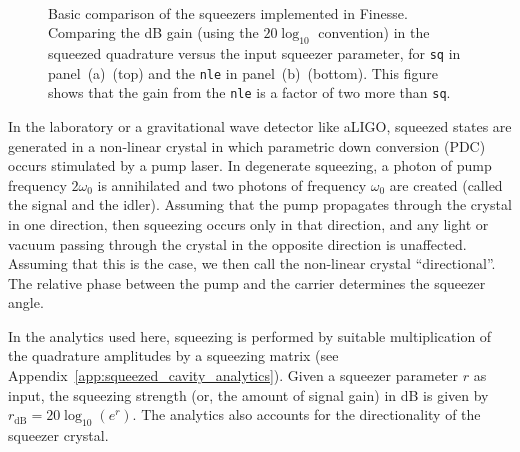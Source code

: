 \documentclass[aps,pra,superscriptaddress,reprint,nofootinbib]{revtex4-1}
\newcommand{\code}[1]{\texttt{#1}}
\begin{document}
\begin{figure}[ht]%
    \centering
    \\
    \caption{Basic comparison of the squeezers implemented in Finesse. Comparing the dB gain (using the $20 \log_{10}$ convention) in the squeezed quadrature versus the input squeezer parameter, for \code{sq} in panel~(a)~(top) and the \code{nle} in panel~(b)~(bottom). This figure shows that the gain from the \code{nle} is a factor of two more than \code{sq}.}%
    \label{fig:testing_Finesse_squeezers}%
\end{figure}

In the laboratory or a gravitational wave detector like aLIGO, squeezed states are generated in a non-linear crystal in which parametric down conversion (PDC) occurs stimulated by a pump laser. In degenerate squeezing, a photon of pump frequency $2\omega_0$ is annihilated and two photons of frequency $\omega_0$ are created (called the signal and the idler).
Assuming that the pump propagates through the crystal in one direction, then squeezing occurs only in that direction, and any light or vacuum passing through the crystal in the opposite direction is unaffected. Assuming that this is the case, we then call the non-linear crystal ``directional''.
The relative phase between the pump and the carrier determines the squeezer angle.


In the analytics used here, squeezing is performed by suitable multiplication of the quadrature amplitudes by a squeezing matrix (see Appendix~\ref{app:squeezed_cavity_analytics}). Given a squeezer parameter $r$ as input, the squeezing strength (or, the amount of signal gain) in dB is given by $r_{\mathrm{dB}} = 20 \log_{10}(e^r)$. The analytics also accounts for the directionality of the squeezer crystal.
\end{document}
